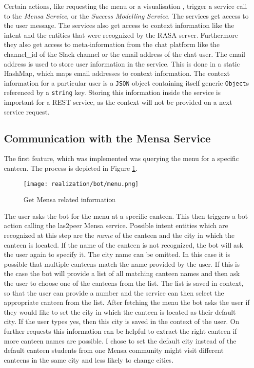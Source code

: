 Certain actions, like requesting the menu or a visualisation , trigger a service call to the \emph{Mensa Service}, or the \emph{Success Modelling Service}.
The services get access to the user message.  
The services also get access to context information like the intent and the entities that were recognized by the RASA server.
Furthermore they also get access to meta-information from the chat platform like the channel\_id of the Slack channel or the email address of the chat user. 
The email address is used to store user information in the service. This is done in a static HashMap, which maps email addresses to context information. The context information for a particular user is a \texttt{JSON} object containing itself generic \texttt{Object}s referenced by a \texttt{string} key. 
Storing this information inside the service is important for a REST service, as the context will not be provided on a next service request.

\subsection{Communication with the Mensa Service}
The first feature, which was implemented was querying the menu for a specific canteen. 
The process is depicted in Figure \ref{fig:getMenu}.
\begin{figure}[h]
    \centering
    \texttt{[image: realization/bot/menu.png]}
    \caption{Get Mensa related information}
    \label{fig:getMenu}
\end{figure}
The user asks the bot for the menu at a specific canteen. 
This then triggers a bot action calling the las2peer Mensa service. 
Possible intent entities which are recognized at this step are the \emph{name} of the canteen and the city in which the canteen is located.
If the name of the canteen is not recognized, the bot will ask  the user again to specify it. The city name can be omitted. In this case it is possible that multiple canteens match the name provided by the user. If this is the case the bot will provide a list of all matching canteen names and then ask the user to choose one of the canteens from the list. The list is saved in context, so that the user can provide a number and the service can then select the appropriate canteen from the list.
After fetching the menu the bot asks the user if they would like to set the city in which the canteen is located as their default city. If the user types yes, then this city is saved in the context of the user. On further requests this information can be helpful to extract the right canteen if more canteen names are possible. 
I chose to set the default city instead of the default canteen students from one Mensa community might visit different canteens in the same city and less likely to change cities. 

